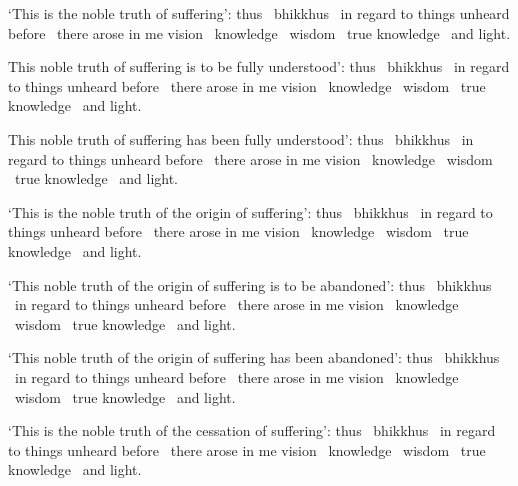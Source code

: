 \begin{english-hang}
  `This is the noble truth of suffering': thus \breathmark\ bhikkhus \breathmark\ in regard to things unheard before \breathmark\ there arose in me vision \breathmark\ knowledge \breathmark\ wisdom \breathmark\ true knowledge \breathmark\ and light.
\end{english-hang}

\begin{english-hang}
  This noble truth of suffering is to be fully understood': thus \breathmark\ bhikkhus \breathmark\ in regard to things unheard before \breathmark\ there arose in me vision \breathmark\ knowledge \breathmark\ wisdom \breathmark\ true knowledge \breathmark\ and light.
\end{english-hang}

\begin{english-hang}
  This noble truth of suffering has been fully understood': thus \breathmark\ bhikkhus \breathmark\ in regard to things unheard before \breathmark\ there arose in me vision \breathmark\ knowledge \breathmark\ wisdom \breathmark\ true knowledge \breathmark\ and light.
\end{english-hang}

\begin{english-hang}
  `This is the noble truth of the origin of suffering': thus \breathmark\ bhikkhus \breathmark\ in regard to things unheard before \breathmark\ there arose in me vision \breathmark\ knowledge \breathmark\ wisdom \breathmark\ true knowledge \breathmark\ and light.
\end{english-hang}

\begin{english-hang}
  `This noble truth of the origin of suffering is to be abandoned': thus \breathmark\ bhikkhus \breathmark\ in regard to things unheard before \breathmark\ there arose in me vision \breathmark\ knowledge \breathmark\ wisdom \breathmark\ true knowledge \breathmark\ and light.
\end{english-hang}

\begin{english-hang}
  `This noble truth of the origin of suffering has been abandoned': thus \breathmark\ bhikkhus \breathmark\ in regard to things unheard before \breathmark\ there arose in me vision \breathmark\ knowledge \breathmark\ wisdom \breathmark\ true knowledge \breathmark\ and light.
\end{english-hang}

\begin{english-hang}
  `This is the noble truth of the cessation of suffering': thus \breathmark\ bhikkhus \breathmark\ in regard to things unheard before \breathmark\ there arose in me vision \breathmark\ knowledge \breathmark\ wisdom \breathmark\ true knowledge \breathmark\ and light.
\end{english-hang}

